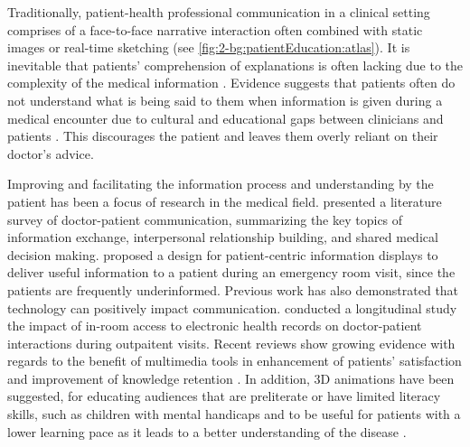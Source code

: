 Traditionally, patient-health professional communication in a clinical setting comprises of a face-to-face narrative interaction often combined with static images or real-time sketching (see \figurename{\ref{fig:2-bg:patientEducation:atlas}}). 
It is inevitable that patients' comprehension of explanations is often lacking due to the complexity of the medical information \cite{Cleeren2014}. Evidence suggests that patients often do not understand what is being said to them when information is given during a medical encounter due to cultural and educational gaps between clinicians and patients \cite{Beranova2007}. This discourages the patient and leaves them overly reliant on their doctor's advice.

Improving and facilitating the information process and understanding by the patient has been a focus of research in the medical field. 
\citet{Ong1995} presented a literature survey of doctor-patient communication, summarizing the key topics of information exchange, interpersonal relationship building, and shared medical decision making. \citet{Wilcox2010a} proposed a design for patient-centric information displays to deliver useful information to a patient during an emergency room visit, since the patients are frequently underinformed. Previous work has also demonstrated that technology can positively impact communication. \citet{Hsu2005} conducted a longitudinal study the impact of in-room access to electronic health records on doctor-patient interactions during outpaitent visits.
Recent reviews show growing evidence with regards to the benefit of multimedia tools in enhancement of patients' satisfaction and improvement of knowledge retention \cite{Beranova2007}. 
In addition, 3D animations have been suggested, for educating audiences that are preliterate or have limited literacy skills, such as children with mental handicaps \cite{T.1997} and to be useful for patients with a lower learning pace as it leads to a better understanding of the disease \cite{Jimison1998}. 
